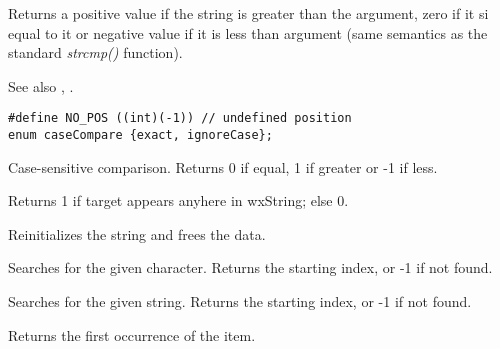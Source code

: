 {Returns a positive value if the string is greater than the argument, zero if
it si equal to it or negative value if it is less than argument (same semantics
as the standard {\it strcmp()} function).

See also , .

\label{wxstringcompareto}

\begin{verbatim}
#define NO_POS ((int)(-1)) // undefined position
enum caseCompare {exact, ignoreCase};
\end{verbatim}
  

Case-sensitive comparison. Returns 0 if equal, 1 if greater or -1 if less.

\label{wxstringcontains}


Returns 1 if target appears anyhere in wxString; else 0.

\label{wxstringempty}


Reinitializes the string and frees the data.

\label{wxstringfind}


Searches for the given character. Returns the starting index, or -1 if not found.


Searches for the given string. Returns the starting index, or -1 if not found.

\label{wxstringfirst}





Returns the first occurrence of the item.

\label{wxstringfreq}

}
